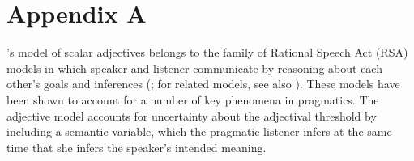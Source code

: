 

\section{Appendix A} \label{app:model}

's model of scalar adjectives belongs to the family of Rational Speech Act (RSA) models in which speaker and listener communicate by  reasoning about each other's goals and inferences (; for related models, see also ). 
These models have been shown to account for a number of key phenomena in pragmatics. The adjective model accounts for uncertainty about the adjectival threshold by including a semantic variable, which the pragmatic listener infers at the same time that she infers the speaker's intended meaning. 

